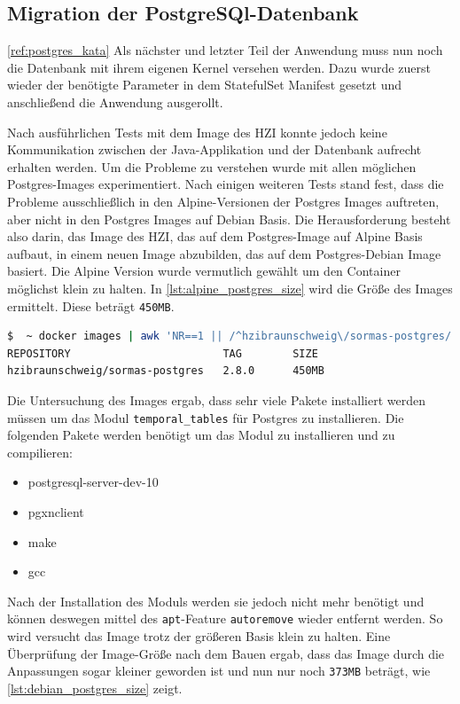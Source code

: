 \subsection{Migration der PostgreSQl-Datenbank}
\ref{ref:postgres_kata}
Als nächster und letzter Teil der Anwendung muss nun noch die Datenbank mit ihrem eigenen Kernel versehen werden.
Dazu wurde zuerst wieder der benötigte Parameter in dem StatefulSet Manifest gesetzt und anschließend die Anwendung ausgerollt.

Nach ausführlichen Tests mit dem Image des \ac{HZI} konnte jedoch keine Kommunikation zwischen der Java-Applikation und der Datenbank aufrecht erhalten werden.
Um die Probleme zu verstehen wurde mit allen möglichen Postgres-Images experimentiert.
Nach einigen weiteren Tests stand fest, dass die Probleme ausschließlich in den Alpine-Versionen der Postgres Images auftreten, aber nicht in den Postgres Images auf Debian Basis. 
Die Herausforderung besteht also darin, das Image des \ac{HZI}, das auf dem Postgres-Image auf Alpine Basis aufbaut, in einem neuen Image abzubilden, das auf dem Postgres-Debian Image basiert.
Die Alpine Version wurde vermutlich gewählt um den Container möglichst klein zu halten. 
In \ref{lst:alpine_postgres_size} wird die Größe des Images ermittelt.
Diese beträgt \texttt{450MB}.

\begin{lstlisting}[language=bash, caption={Größe des ursprünglichen Postgres Images}, label=lst:alpine_postgres_size]
$  ~ docker images | awk 'NR==1 || /^hzibraunschweig\/sormas-postgres/ {printf "%-33s %-10s %s\n", $1, $2, $NF}'
REPOSITORY                        TAG        SIZE
hzibraunschweig/sormas-postgres   2.8.0      450MB
\end{lstlisting}

Die Untersuchung des Images ergab, dass sehr viele Pakete installiert werden müssen um das Modul \texttt{temporal\_tables} für Postgres zu installieren.
Die folgenden Pakete werden benötigt um das Modul zu installieren und zu compilieren:
\begin{itemize}
  \item postgresql-server-dev-10
  \item pgxnclient 
  \item make
  \item gcc
\end{itemize}

Nach der Installation des Moduls werden sie jedoch nicht mehr benötigt und können deswegen mittel des \texttt{apt}-Feature \texttt{autoremove} wieder entfernt werden. 
So wird versucht das Image trotz der größeren Basis klein zu halten.
Eine Überprüfung der Image-Größe nach dem Bauen ergab, dass das Image durch die Anpassungen sogar kleiner geworden ist und nun nur noch \texttt{373MB} beträgt, wie \ref{lst:debian_postgres_size} zeigt.

